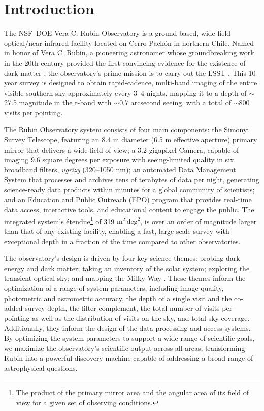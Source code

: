 \section{Introduction
\label{sec:intro}}
The \gls{NSF}–\gls{DOE} Vera C. Rubin Observatory is a ground-based, wide-field optical/near-infrared facility located on Cerro Pach\'on in northern Chile.
Named in honor of Vera C. Rubin, a pioneering astronomer whose groundbreaking work in the 20th century provided the first convincing evidence for the existence of dark matter \citep{1970ApJ...159..379R, 1980ApJ...238..471R}, the observatory’s prime mission is to carry out the \gls{LSST} \citep{2019ApJ...873..111I}.
This 10-year survey is designed to obtain rapid-cadence, multi-band imaging of the entire visible southern sky approximately every 3–4 nights, mapping it to a depth of $\sim$ 27.5 magnitude in the r-band with $\sim$0.7 arcsecond \gls{seeing}, with a total of $\sim$800 visits per pointing.

The Rubin Observatory system consists of four main components: the Simonyi Survey Telescope, featuring an 8.4 m diameter (6.5 m effective aperture) primary mirror that delivers a wide field of view; a 3.2-gigapixel Camera, capable of imaging 9.6 square degrees per exposure with seeing-limited quality in six broadband filters, \textit{ugrizy} (320–1050 nm); an automated \gls{Data Management System} that processes and archives tens of terabytes of data per night, generating science-ready data products within minutes for a global community of scientists; and an Education and Public Outreach (\gls{EPO}) program that provides real-time data access, interactive tools, and educational content to engage the public.
The integrated system's \'etendue\footnote{The product of the primary mirror area and the angular area of its field of view for a given set of observing conditions.} of 319 $\text{m}^2 \,\text{deg}^2$, is over an order of magnitude larger than that of any existing facility, enabling a fast, large-scale survey with exceptional depth in a fraction of the time compared to other observatories.

The observatory's design is driven by four key science themes: probing dark energy and dark matter; taking an inventory of the solar system; exploring the \gls{transient} optical sky; and mapping the Milky Way \citep{2019ApJ...873..111I}.
These themes inform the optimization of a range of system parameters, including image quality, photometric and astrometric accuracy, the depth of a single visit and the co-added survey depth, the filter complement, the total number of visits per pointing as well as the distribution of visits on the sky, and  total sky coverage.
Additionally, they inform the design of the data processing and access systems.
By optimizing the system parameters to support a wide range of scientific goals, we maximize the observatory's scientific output across all areas, transforming Rubin into a powerful discovery machine capable of addressing a broad range of astrophysical questions.

